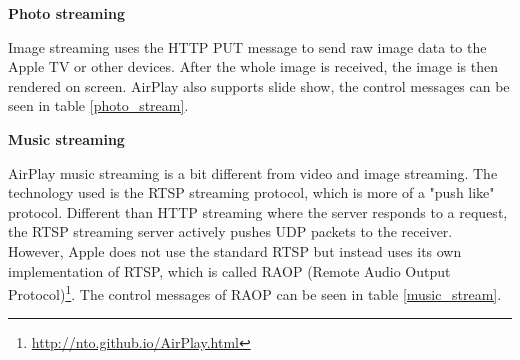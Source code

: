 \textbf{Photo streaming}

Image streaming uses the HTTP PUT message to send raw image data to the Apple TV
or other devices. After the whole image is received, the image is then rendered on 
screen. AirPlay also supports slide show, the control messages can be seen in 
table \ref{photo_stream}.

\begin{table}[htb] 
\caption{AirPlay Photo Control HTTP requests \label{photo_stream}} 
\begin{center} 
\end{center} 
\end{table} 
\clearpage
\textbf{Music streaming}

AirPlay music streaming is a bit different from video and image streaming. The 
technology used is the RTSP streaming protocol, which is more of a "push like"
protocol. Different than HTTP streaming where the server responds to a request,
the RTSP streaming server actively pushes UDP packets to the receiver. However,
Apple does not use the standard RTSP but instead uses its own implementation of
RTSP, which is called RAOP (Remote Audio Output
Protocol)\footnote{\url{http://nto.github.io/AirPlay.html}}.
The control messages of RAOP can be seen in table \ref{music_stream}.

\begin{table}[htb] 
\caption{AirPlay Audio Control RTSP requests \label{music_stream}} 
\begin{center} 
\end{center} 
\end{table} 

